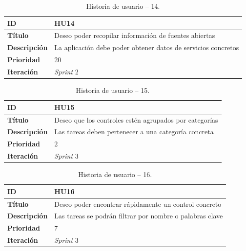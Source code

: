 \begin{table}[H]
    \begin{center}
        \begin{tabularx}{\textwidth}{| l | X |}
            \hline
            \textbf{ID}             & HU14 \\ \hline
            \textbf{Título}         & Deseo poder recopilar información de fuentes abiertas \\ \hline
            \textbf{Descripción}    & La aplicación debe poder obtener datos de servicios concretos \\ \hline
            \textbf{Prioridad}      & 20 \\ \hline
            \textbf{Iteración}      & \textit{Sprint} 2\\ \hline
        \end{tabularx}
    \end{center}
    \caption{Historia de usuario -- 14.}
    \label{tab:hu14}
\end{table}

\begin{table}[H]
    \begin{center}
        \begin{tabularx}{\textwidth}{| l | X |}
            \hline
            \textbf{ID}             & HU15 \\ \hline
            \textbf{Título}         & Deseo que los controles estén agrupados por categorías \\ \hline
            \textbf{Descripción}    & Las tareas deben pertenecer a una categoría concreta \\ \hline
            \textbf{Prioridad}      & 2 \\ \hline
            \textbf{Iteración}      & \textit{Sprint} 3\\ \hline
        \end{tabularx}
    \end{center}
    \caption{Historia de usuario -- 15.}
    \label{tab:hu15}
\end{table}

\begin{table}[H]
    \begin{center}
        \begin{tabularx}{\textwidth}{| l | X |}
            \hline
            \textbf{ID}             & HU16 \\ \hline
            \textbf{Título}         & Deseo poder encontrar rápidamente un control concreto \\ \hline
            \textbf{Descripción}    & Las tareas se podrán filtrar por nombre o palabras clave \\ \hline
            \textbf{Prioridad}      & 7 \\ \hline
            \textbf{Iteración}      & \textit{Sprint} 3\\ \hline
        \end{tabularx}
    \end{center}
    \caption{Historia de usuario -- 16.}
    \label{tab:hu16}
\end{table}

